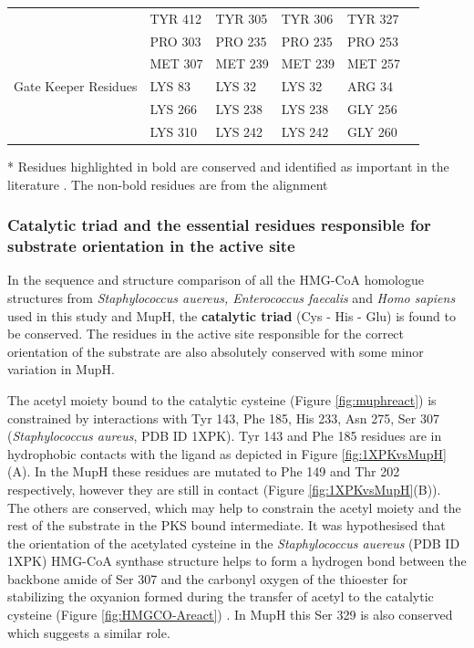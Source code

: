 \begin{table}[htbp]
\begin{small}
\begin{center}
\begin{threeparttable}[b]
\begin{tabular}{p{4cm} p{2.5cm} p{2.5cm} p{2.5cm} p{2.5cm} p{2.5cm} }
				 & TYR 412 & TYR 305 & TYR 306 & TYR 327 \\ 
				 & PRO 303 & PRO 235 & PRO 235 & PRO 253 \\ 
				 & MET 307 & MET 239 & MET 239 & MET 257 \\ 
				Gate Keeper Residues & LYS 83 & LYS 32 & LYS 32 & ARG 34 \\ 
				 & LYS 266 & LYS 238 & LYS 238 & GLY 256 \\ 
				 & LYS 310 & LYS 242 & LYS 242 & GLY 260 \\ 
				\bottomrule[2pt]
				\end{tabular}
				\begin{tablenotes}
					\item[*] Residues highlighted in bold are conserved and identified as important in the literature \parencite{Theisen2004, Steussy2005, Shafqat2010}. The non-bold residues are from the alignment
					\end{tablenotes}
				\end{threeparttable}
				\end{center}
				\end{small}
				\end{table}
	
		\subsubsection{Catalytic triad and the essential residues responsible for substrate orientation in the active site}
		\label{sec:catalytictriad}
		In the sequence and structure comparison of all the HMG-CoA homologue structures from \textit{Staphylococcus auereus, Enterococcus faecalis} and \textit{Homo sapiens} used in this study and MupH, the \textbf{catalytic triad} (Cys - His - Glu) is found to be conserved. The residues in the active site responsible for the correct orientation of the substrate are also absolutely conserved with some minor variation in MupH.
		
		The acetyl moiety bound to the catalytic cysteine (Figure \ref{fig:muphreact}) is constrained by interactions with  Tyr 143, Phe 185, His 233, Asn 275, Ser 307 (\textit{Staphylococcus aureus}, PDB ID 1XPK). Tyr 143 and Phe 185 residues are in hydrophobic contacts with the ligand as depicted in Figure \ref{fig:1XPKvsMupH}(A). In the MupH these residues are mutated to Phe 149 and Thr 202 respectively, however they are still in contact (Figure \ref{fig:1XPKvsMupH}(B)). The others are conserved, which may help to constrain the acetyl moiety and the rest of the substrate in the PKS bound intermediate. It was hypothesised that the orientation of the acetylated cysteine  in the \textit{Staphylococcus auereus} (PDB ID 1XPK) HMG-CoA synthase structure helps to form a hydrogen bond between the backbone amide of Ser 307 and the carbonyl oxygen of the thioester for stabilizing the oxyanion formed during the transfer of acetyl to the catalytic cysteine (Figure \ref{fig:HMGCO-Areact}) \parencite{Theisen2004}. In MupH this Ser 329 is also conserved which suggests a similar role.

